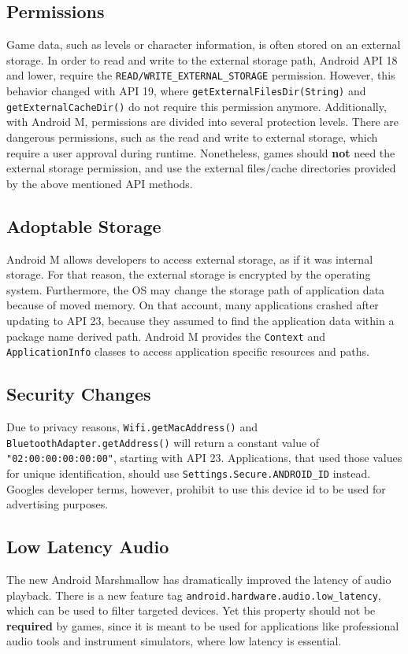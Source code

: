 \documentclass[a4paper]{article}
\newcommand{\code}[1]{\colorbox{codegray}{\texttt{#1}}}
\begin{document}
\subsection{Permissions}
Game data, such as levels or character information, is often stored on an external storage. In order to read and write to the external storage path, Android API 18 and lower, require the \code{READ/WRITE\_EXTERNAL\_STORAGE} permission. However, this behavior changed with API 19, where \code{getExternalFilesDir(String)} and \code{getExternalCacheDir()} do not require this permission anymore. Additionally, with Android M, permissions are divided into several protection levels. There are dangerous permissions, such as the read and write to external storage, which require a user approval during runtime. Nonetheless, games should \textbf{not} need the external storage permission, and use the external files/cache directories provided by the above mentioned API methods.

\subsection{Adoptable Storage}
Android M allows developers to access external storage, as if it was internal storage. For that reason, the external storage is encrypted by the operating system. Furthermore, the OS may change the storage path of application data because of moved memory. On that account, many applications crashed after updating to API 23, because they assumed to find the application data within a package name derived path. Android M provides the \code{Context} and \code{ApplicationInfo} classes to access application specific resources and paths.

\subsection{Security Changes}
Due to privacy reasons, \code{Wifi.getMacAddress()} and \code{BluetoothAdapter.getAddress()} will return a constant value of \code{"02:00:00:00:00:00"}, starting with API 23. Applications, that used those values for unique identification, should use \code{Settings.Secure.ANDROID\_ID} instead. Googles developer terms, however, prohibit to use this device id to be used for advertising purposes.

\subsection{Low Latency Audio}
\label{feature:low-latency-audio}
The new Android Marshmallow has dramatically improved the latency of audio playback. There is a new feature tag \code{android.hardware.audio.low\_latency}, which can be used to filter targeted devices. Yet this property should not be \textbf{required} by games, since it is meant to be used for applications like professional audio tools and instrument simulators, where low latency is essential.
\end{document}
